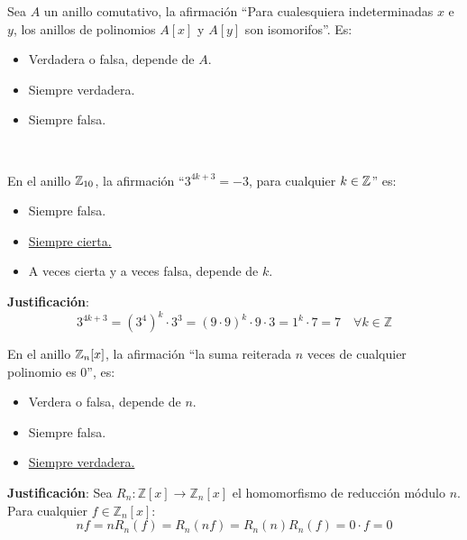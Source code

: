 \begin{ejercicio}
    Sea $A$ un anillo comutativo, la afirmación ``Para cualesquiera indeterminadas $x$ e $y$, los anillos de polinomios $A[x]$ y $A[y]$ son isomorifos''. Es:
    \begin{itemize}
        \item Verdadera o falsa, depende de $A$.
        \item Siempre verdadera.
        \item Siempre falsa.
    \end{itemize}
\end{ejercicio}

\newpage
\ %
\resetearcontador

\begin{ejercicio}
    En el anillo $\mathbb{Z}_{10}$, la afirmación ``$3^{4k+3} = -3$, para cualquier $k \in \mathbb{Z}$'' es:
    \begin{itemize}
        \item Siempre falsa.
        \item \underline{Siempre cierta.}
        \item A veces cierta y a veces falsa, depende de $k$.
    \end{itemize}

    \noindent
    \textbf{Justificación}:
    \begin{equation*}
    3^{4k+3}={(3^4)}^k \cdot 3^3 = {(9 \cdot  9)}^k \cdot 9 \cdot 3 = 1^k \cdot 7 = 7\quad \forall k \in \mathbb{Z}
    \end{equation*}
\end{ejercicio}

\begin{ejercicio}
    En el anillo $\mathbb{Z}_n[x]$, la afirmación ``la suma reiterada $n$ veces de cualquier polinomio es $0$'', es:
    \begin{itemize}
        \item Verdera o falsa, depende de $n$.
        \item Siempre falsa.
        \item \underline{Siempre verdadera.}
    \end{itemize}

    \noindent
    \textbf{Justificación}:
    Sea $R_n:\mathbb{Z}[x]\to \mathbb{Z}_n[x]$ el homomorfismo de reducción módulo $n$. Para cualquier $f \in \mathbb{Z}_n[x]$:
    \begin{equation*}
        nf = nR_n(f) = R_n(nf) = R_n(n)R_n(f) = 0 \cdot f = 0
    \end{equation*}
\end{ejercicio}

